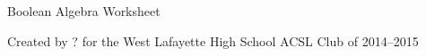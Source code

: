 \documentclass[12pt,letterpaper]{article}
\begin{document}
\begin{center}
  Boolean Algebra Worksheet
  
  Created by ? for the West Lafayette High School ACSL Club of 2014--2015
\end{center}
\end{document}
